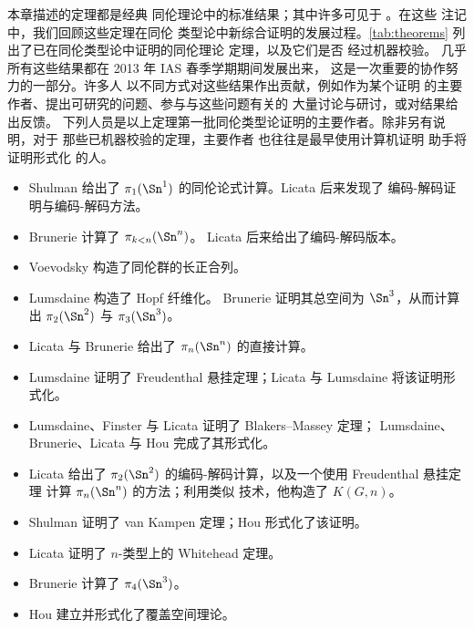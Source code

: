 本章描述的定理都是经典
同伦理论中的标准结果；其中许多可见于 \cite{hatcher02topology}。在这些
注记中，我们回顾这些定理在同伦
类型论中新综合证明的发展过程。\cref{tab:theorems} 列出了已在同伦类型论中证明的同伦理论
定理，以及它们是否
经过机器校验。
几乎所有这些结果都在 2013 年 IAS 春季学期期间发展出来，
这是一次重要的协作努力的一部分。许多人
以不同方式对这些结果作出贡献，例如作为某个证明
的主要作者、提出可研究的问题、参与与这些问题有关的
大量讨论与研讨，或对结果给出反馈。
下列人员是以上定理第一批同伦类型论证明的主要作者。除非另有说明，对于
那些已机器校验的定理，主要作者
也往往是最早使用计算机证明
助手将证明形式化 的人。
\begin{itemize}
\item
Shulman 给出了 $\pi_1(\Sn^1)$ 的同伦论式计算。Licata 后来发现了
编码-解码证明与编码-解码方法。

\item
Brunerie 计算了 $\pi_{k<n}(\Sn ^ n)$。
Licata 后来给出了编码-解码版本。

\item Voevodsky 构造了同伦群的长正合列。

\item Lumsdaine 构造了 Hopf 纤维化。
  Brunerie 证明其总空间为 $\Sn ^3$，从而计算出 $\pi_2(\Sn ^2)$ 与
  $\pi_3(\Sn ^3)$。

\item Licata 与 Brunerie 给出了
$\pi_n(\Sn ^n)$ 的直接计算。

\item
  Lumsdaine 证明了 Freudenthal 悬挂定理；Licata 与
  Lumsdaine 将该证明形式化。
\item Lumsdaine、Finster 与 Licata 证明了 Blakers--Massey 定理；
  Lumsdaine、Brunerie、Licata 与 Hou 完成了其形式化。

\item
Licata 给出了 $\pi_2(\Sn ^2)$ 的编码-解码计算，以及一个使用 Freudenthal 悬挂定理
计算 $\pi_n(\Sn ^n)$ 的方法；利用类似
技术，他构造了 $K(G,n)$。

\item
Shulman 证明了 van Kampen 定理；Hou 形式化了该证明。

\item
Licata 证明了 $n$-类型上的 Whitehead 定理。

\item Brunerie 计算了 $\pi_4(\Sn ^3)$。

\item
Hou 建立并形式化了覆盖空间理论。
\end{itemize}

